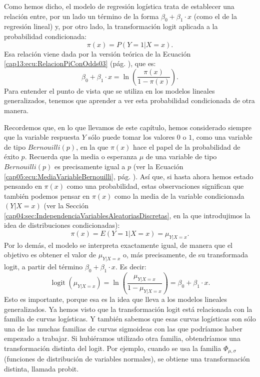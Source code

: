Como hemos dicho, el modelo de regresión logística trata de establecer una relación entre, por un lado un término de la forma $\beta_0+\beta_1\cdot x$ (como el de la regresión lineal) y, por otro lado, la transformación logit aplicada a la probabilidad condicionada:
\[\pi(x)=P(Y=1|X=x).\]
Esa relación viene dada por la versión teórica de la Ecuación \ref{cap13:ecu:RelacionPiConOdds03} (pág. \pageref{cap13:ecu:RelacionPiConOdds03}), que es:
\begin{equation}
\beta_0+\beta_1\cdot x = \ln\left(\dfrac{\pi(x)}{1-\pi(x)}\right).
\end{equation}
Para entender el punto de vista que se utiliza en los modelos lineales generalizados, tenemos que aprender a ver esta probabilidad condicionada de otra manera.

Recordemos que, en  lo que llevamos de este capítulo, hemos considerado siempre que la variable respuesta $Y$ sólo puede tomar los valores $0$ o $1$, como una variable de tipo $Bernouilli(p)$, en la que $\pi(x)$ hace el papel de la probabilidad de éxito $p$. Recuerda que la media o esperanza $\mu$ de una variable de tipo $Bernouilli(p)$ es precisamente igual a $p$ (ver la Ecuación \ref{cap05:ecu:MediaVariableBernouilli}, pág. \pageref{cap05:ecu:MediaVariableBernouilli}). Así que, si hasta ahora hemos estado pensando en $\pi(x)$ como una probabilidad, estas observaciones significan que también podemos pensar en $\pi(x)$ como la media de la variable condicionada $(Y|X=x)$ (ver la Sección \ref{cap04:sec:IndependenciaVariablesAleatoriasDiscretas}, en la que introdujimos la idea de distribuciones condicionadas):
\begin{equation}
\label{cap13:ecu:PiComoEsperanza}
\pi(x)=E(Y=1|X=x)=\mu_{Y|X=x}.
\end{equation}
Por lo demás, el modelo se interpreta exactamente igual, de manera que el objetivo es obtener el valor de $\mu_{Y|X=x}$ o, más precisamente, de su transformada logit, a partir del término $\beta_0+\beta_1\cdot x$. Es decir:
\begin{equation}
\label{cap13:ecu:RegresionLogisticaComoGlm}
\operatorname{logit}(\mu_{Y|X=x}) =
\ln\left(\dfrac{\mu_{Y|X=x}}{1-\mu_{Y|X=x}}\right)=
\beta_0+\beta_1\cdot x.
\end{equation}
Esto es importante, porque esa es la idea que lleva a los modelos lineales generalizados. Ya hemos visto que la transformación logit está relacionada con la familia de curvas logísticas. Y también sabemos que esas curvas logísticas son sólo una de las muchas familias de curvas sigmoideas con las que podríamos haber empezado a trabajar. Si hubiéramos utilizado otra familia, obtendríamos una transformación distinta del logit. Por ejemplo, cuando se usa la familia $\Phi_{\mu,\sigma}$ (funciones de distribución de variables normales), se obtiene una transformación distinta, llamada {\sf probit}.

